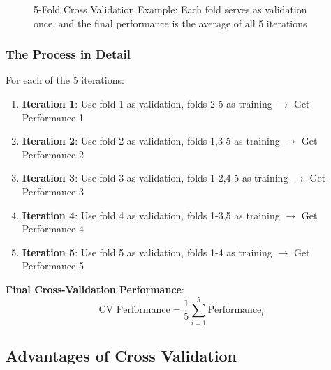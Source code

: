 \documentclass[11pt,a4paper]{article}
\theoremstyle{definition}
\theoremstyle{plain}
\theoremstyle{remark}
\begin{document}
\begin{figure}[h]
\caption{5-Fold Cross Validation Example: Each fold serves as validation once, and the final performance is the average of all 5 iterations}
\end{figure}

\subsubsection{The Process in Detail}

For each of the 5 iterations:

\begin{enumerate}
    \item \textbf{Iteration 1}: Use fold 1 as validation, folds 2-5 as training $\rightarrow$ Get Performance 1
    \item \textbf{Iteration 2}: Use fold 2 as validation, folds 1,3-5 as training $\rightarrow$ Get Performance 2
    \item \textbf{Iteration 3}: Use fold 3 as validation, folds 1-2,4-5 as training $\rightarrow$ Get Performance 3
    \item \textbf{Iteration 4}: Use fold 4 as validation, folds 1-3,5 as training $\rightarrow$ Get Performance 4
    \item \textbf{Iteration 5}: Use fold 5 as validation, folds 1-4 as training $\rightarrow$ Get Performance 5
\end{enumerate}

\textbf{Final Cross-Validation Performance}:
\[
\text{CV Performance} = \frac{1}{5} \sum_{i=1}^{5} \text{Performance}_i
\]

\subsection{Advantages of Cross Validation}
\end{document}
